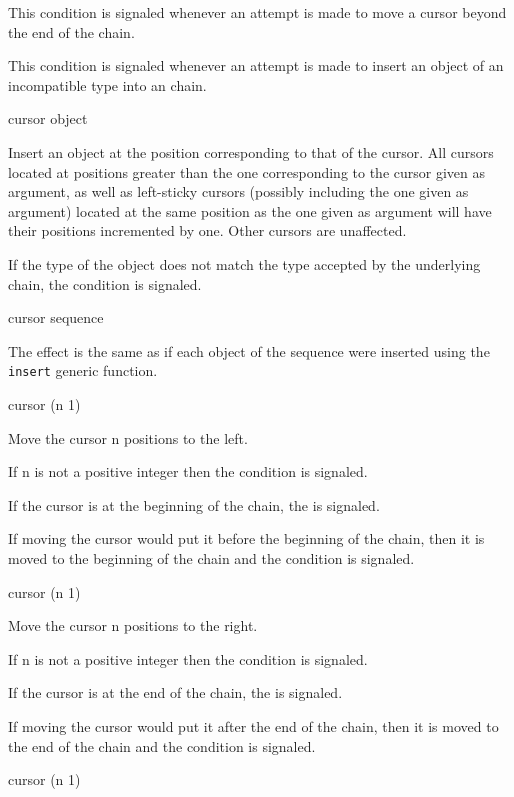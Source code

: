 \documentclass[11pt]{article}
\begin{document}
This condition is signaled whenever an attempt is made to move a
cursor beyond the end of the chain.


This condition is signaled whenever an attempt is made to insert an
object of an incompatible type into an chain.

 {cursor object}

Insert an object at the position corresponding to that of the cursor.
All cursors located at positions greater than the one corresponding to
the cursor given as argument, as well as left-sticky cursors (possibly
including the one given as argument)  located at the same position as
the one given as argument will have their positions incremented by
one. Other cursors are unaffected.

If the type of the object does not match the type accepted by the
underlying chain, the  condition is
signaled.

 {cursor sequence}

The effect is the same as if each object of the sequence were
inserted using the \texttt{insert} generic function.

 {cursor \optional (n 1)}

Move the cursor n positions to the left.

If n is not a positive integer then the  condition is signaled.

If the cursor is at the beginning of the chain, the  is
signaled.

If moving the cursor would put it before the beginning of the chain, then it
is moved to the beginning of the chain and the 
condition is signaled.

 {cursor \optional (n 1)}

Move the cursor n positions to the right.

If n is not a positive integer then the  condition is signaled.

If the cursor is at the end of the chain, the  is signaled.

If moving the cursor would put it after the end of the chain, then it is moved
to the end of the chain and the  condition is
signaled.

 {cursor \optional (n 1)}
\end{document}

